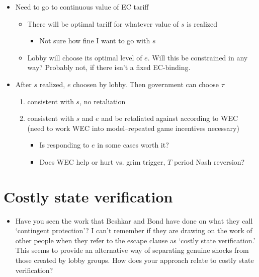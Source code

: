 \documentclass[12pt]{article}
\begin{document}
\begin{itemize}
\begin{itemize}
				\end{itemize}
			\item Need to go to continuous value of EC tariff
				\begin{itemize}
					\item There will be optimal tariff for whatever value of $s$ is realized
						\begin{itemize}
							\item Not sure how fine I want to go with $s$
						\end{itemize}
					\item Lobby will choose its optimal level of $e$. Will this be constrained in any way? Probably not, if there isn't a fixed EC-binding.
				\end{itemize}
			\item After $s$ realized, $e$ choosen by lobby. Then government can choose $\tau$
				\begin{enumerate}
					\item consistent with $s$, no retaliation
					\item consistent with $s$ and $e$ and be retaliated against according to WEC (need to work WEC into model--repeated game incentives necessary)
						\begin{itemize}
							\item Is responding to $e$ in some cases worth it?
							\item Does WEC help or hurt vs. grim trigger, $T$ period Nash reversion?
						\end{itemize}
				\end{enumerate}
		\end{itemize}
\section{Costly state verification}
		\begin{itemize}
				\item Have you seen the work that Beshkar and Bond have done on what they call `contingent protection'?  I can't remember if they are drawing on the work of other people when they refer to the escape clause as `costly state verification.'  This seems to provide an alternative way of separating genuine shocks from those created by lobby groups.  How does your approach relate to costly state verification?
		\end{itemize}

\newpage
\end{document}
